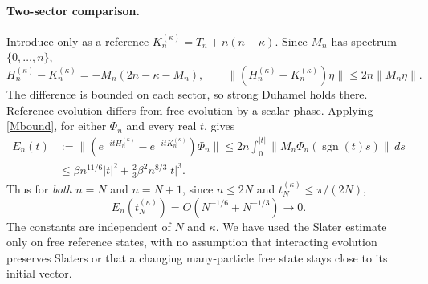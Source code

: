 \documentclass[11pt]{article}
\begin{document}
\paragraph{Two-sector comparison.}
Introduce only as a reference
$K_n^{(\kappa)}=T_n+n(n-\kappa)$.
Since $M_n$ has spectrum $\{0,\ldots,n\}$,
\begin{equation}\label{difference}
 H_n^{(\kappa)}-K_n^{(\kappa)}
 =-M_n(2n-\kappa-M_n),\qquad
 \|(H_n^{(\kappa)}-K_n^{(\kappa)})\eta\|\leq2n\|M_n\eta\|.
\end{equation}
The difference is bounded on each sector, so strong Duhamel holds there.
Reference evolution differs from free evolution by a scalar phase. Applying
\eqref{Mbound}, for either $\Phi_n$ and every real $t$, gives
\begin{align}
 E_n(t)&:=\|(e^{-itH_n^{(\kappa)}}-e^{-itK_n^{(\kappa)}})\Phi_n\|
 \leq2n\int_0^{|t|}\|M_n\Phi_n(\operatorname{sgn}(t)s)\|\,ds\nonumber\\
 &\leq\beta n^{11/6}|t|^2+\tfrac23\beta^2n^{8/3}|t|^3.
 \label{E}
\end{align}
Thus for \emph{both} $n=N$ and $n=N+1$, since
$n\leq2N$ and $t_N^{(\kappa)}\leq\pi/(2N)$,
\begin{equation}\label{decay}
 E_n(t_N^{(\kappa)})=O(N^{-1/6}+N^{-1/3})\longrightarrow0 .
\end{equation}
The constants are independent of $N$ and $\kappa$. We have used the Slater
estimate only on free reference states, with no assumption that interacting
evolution preserves Slaters or that a changing many-particle free state stays
close to its initial vector.
\end{document}

